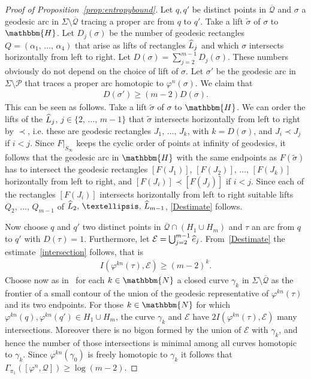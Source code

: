 \documentclass[10pt,a4paper]{amsart}
\numberwithin{equation}{section}
\newcommand{\N}{\mathbbm{N}}
\newcommand{\Hy}{\mathbbm{H}}
\newcommand{\clP}{\mathcal{P}}
\newcommand{\clQ}{\mathcal{Q}}
\newcommand{\clE}{\mathcal{E}}
\let\oldhat\hat
\renewcommand*{\hat}[1]{\mathchoice{\widehat{#1}}{\widehat{#1}}{\oldhat{#1}}{\oldhat{#1}}}
\theoremstyle{definition}
\theoremstyle{remark}
\begin{document}
\begin{proof}[Proof of Proposition~\ref{prop:entropybound}]
Let $q, q'$ be distinct points in $\overline{\clQ}$ and $\sigma$ a geodesic arc in $\Sigma \setminus \overline{\clQ}$ tracing a proper arc from $q$ to $q'$. Take a lift $\widetilde{\sigma}$ of $\sigma$ to $\Hy$. Let $D_j(\sigma)$ be the number of geodesic rectangles $Q=(\alpha_1,\, \ldots,\, \alpha_4)$ that arise as lifts of rectangles $\hat{L}_j$ and which $\sigma$ intersects horizontally from left to right. Let $D(\sigma) = \sum_{j=2}^{m-1} D_j(\sigma)$. These numbers obviously do not depend on the choice of lift of $\sigma$. Let $\sigma'$ be the geodesic arc in $\Sigma \setminus \clP$ that traces a proper arc homotopic to $\varphi^n(\sigma)$. We claim that
\begin{align}\label{Destimate}
D(\sigma') \geq (m-2)D(\sigma).
\end{align}
This can be seen as follows. Take a lift $\widetilde{\sigma}$ of $\sigma$ to $\Hy$. We can order the lifts of the $\hat{L}_j$, $j\in \{2,\, \ldots,\, m-1\}$ that $\widetilde{\sigma}$ intersects horizontally from left to right by $\prec$, i.e. these are geodesic rectangles $J_1,\, \ldots,\, J_k$, with $k=D(\sigma)$, and $J_i \prec J_j$ if $i<j$. Since $F|_{S_{\infty}}$ keeps the cyclic order of points at infinity of geodesics, it follows that the geodesic arc in $\Hy$ with the same endpoints as $F(\widetilde\sigma)$ has to intersect the geodesic rectangles $[F(J_1)]$, $[F(J_2)],\, \ldots,\, [F(J_k)]$ horizontally from left to right, and $[F(J_i)] \prec [F(J_j)]$ if $i< j$. Since each of the rectangles $[F(J_i)]$ intersects horizontally from left to right suitable lifts $Q_2, \,\ldots,\, Q_{m-1}$ of $\hat{L}_2,\, \ldots,\, \hat{L}_{m-1}$, \eqref{Destimate} follows.

Now choose $q$ and $q'$ two distinct points in $\overline{\clQ} \cap (H_1 \cup H_m)$ and $\tau$ an arc from $q$ to $q'$ with $D(\tau) = 1$. Furthermore, let $\clE = \bigcup_{j=2}^{m-1} \hat{e}_j$. From~\eqref{Destimate} the estimate~\eqref{intersection} follows, that is
\begin{align*}
I(\varphi^{kn}(\tau), \clE) \geq (m-2)^k.
\end{align*}
Choose now as in~\cite{FranksHandel1988} for each $k\in \N$ a closed curve $\gamma_k$ in $\Sigma\setminus \overline{\clQ}$ as the frontier of a small contour of the union of the geodesic representative of $\varphi^{kn}(\tau)$ and its two endpoints. For those $k \in \N$ for which $\varphi^{kn}(q), \varphi^{kn}(q') \in H_1 \cup H_m$, the curve $\gamma_k$ and $\clE$ have $2I(\varphi^{kn}(\tau), \clE)$ many intersections. Moreover there is no bigon formed by the union of $\clE$ with $\gamma_k$, and hence the number of those intersections is minimal among all curves homotopic to $\gamma_k$. Since $\varphi^{kn}(\gamma_0)$ is freely homotopic to $\gamma_k$ it follows that $\Gamma_{\pi_1}([\varphi^n, \clQ]) \geq \log(m-2)$.
\end{proof}
\end{document}
